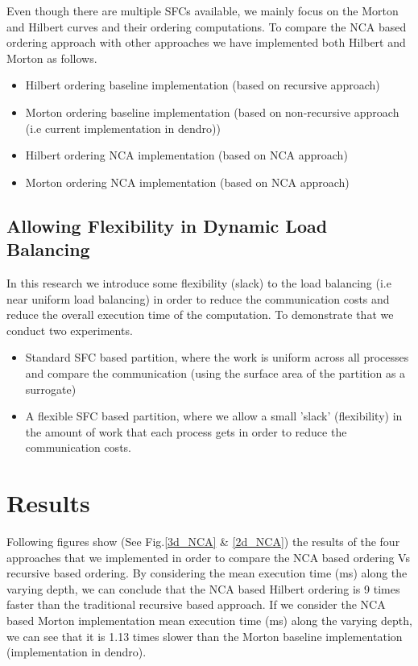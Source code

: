 \documentclass[a0,landscape]{a0poster}
\begin{document}
\begin{multicols}{4}
Even though there are multiple SFCs available, we mainly focus on the Morton and Hilbert curves and their ordering computations. To compare the NCA based ordering approach with other approaches we have
implemented both Hilbert and Morton as follows.
\color{olive}
\begin{itemize}
 \item Hilbert ordering baseline implementation (based on recursive approach)
 \item Morton ordering baseline implementation (based on non-recursive approach (i.e current implementation in dendro\cite{Sampath:2008:DPA:1413370.1413389}))
 \item Hilbert ordering NCA implementation (based on NCA approach)
 \item Morton ordering NCA implementation (based on NCA approach)
\end{itemize}

\color{DarkSlateGray}
\subsection*{Allowing Flexibility in Dynamic Load Balancing}

In this research we introduce some flexibility (slack) to the load balancing (i.e near uniform load balancing) in order to reduce the communication costs and reduce the overall execution time of the computation.
To demonstrate that we conduct two experiments.

\begin{itemize}
 \item \color{brown}Standard SFC based partition, where the work is uniform across all processes and compare the communication (using the surface area of the partition as a surrogate)
 \item \color{brown}A flexible SFC based partition, where we allow a small 'slack' (flexibility) in the amount of work that each process gets in order to reduce the communication costs. 
\end{itemize}



\section*{Results}

Following figures show (See Fig.\ref{3d_NCA} \& \ref{2d_NCA}) the results of the four approaches that we implemented in order to compare the NCA based ordering Vs recursive based ordering.
By considering the mean execution time (ms) along the varying depth, we can conclude that the NCA based Hilbert ordering is 9 times faster than the traditional recursive based approach. If we consider the
NCA based Morton implementation mean execution time (ms) along the varying depth, we can see that it is 1.13 times slower than the Morton baseline implementation (implementation in dendro\cite{Sampath:2008:DPA:1413370.1413389}). 


\end{multicols}
\end{document}
